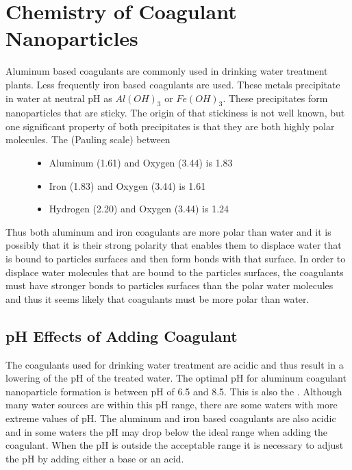 \documentclass[letterpaper,10pt,english]{sphinxmanual}
\begin{document}
\section{Chemistry of Coagulant Nanoparticles}
\label{\detokenize{Rapid_Mix/RM_Intro:chemistry-of-coagulant-nanoparticles}}\label{\detokenize{Rapid_Mix/RM_Intro:heading-chemistry-of-coagulant-nanoparticles}}\begin{description}
\item[{Aluminum based coagulants are commonly used in drinking water treatment plants. Less frequently iron based coagulants are used. These metals precipitate in water at neutral pH as \(Al(OH)_3\) or \(Fe(OH)_3\). These precipitates form nanoparticles that are sticky. The origin of that stickiness is not well known, but one significant property of both precipitates is that they are both highly polar molecules. The  (Pauling scale) between}] \leavevmode\begin{itemize}
\item {} 
Aluminum (1.61) and Oxygen (3.44) is 1.83

\item {} 
Iron (1.83) and Oxygen (3.44) is 1.61

\item {} 
Hydrogen (2.20) and Oxygen (3.44) is 1.24

\end{itemize}

\end{description}

Thus both aluminum and iron coagulants are more polar than water and it is possibly that it is their strong polarity that enables them to displace water that is bound to particles surfaces and then form bonds with that surface. In order to displace water molecules that are bound to the particles surfaces, the coagulants must have stronger bonds to particles surfaces than the polar water molecules and thus it seems likely that coagulants must be more polar than water.


\subsection{pH Effects of Adding Coagulant}
\label{\detokenize{Rapid_Mix/RM_Intro:ph-effects-of-adding-coagulant}}\label{\detokenize{Rapid_Mix/RM_Intro:heading-ph-effects-of-adding-coagulant}}
The coagulants used for drinking water treatment are acidic and thus result in a lowering of the pH of the treated water. The optimal pH for aluminum coagulant nanoparticle formation is between pH of 6.5 and 8.5. This is also the . Although many water sources are within this pH range, there are some waters with more extreme values of pH. The aluminum and iron based coagulants are also acidic and in some waters the pH may drop below the ideal range when adding the coagulant. When the pH is outside the acceptable range it is necessary to adjust the pH by adding either a base or an acid.
\end{document}
